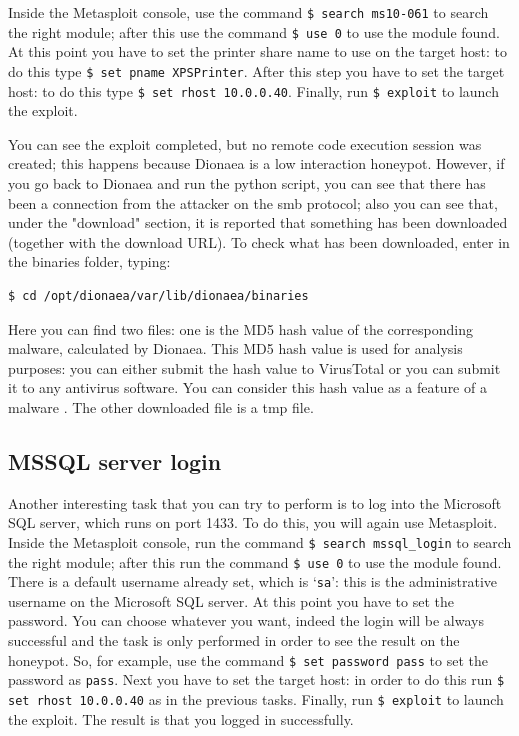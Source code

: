 \documentclass[epsfig,a4paper,11pt,titlepage,oneside,openany]{book}
\begin{document}
\begin{itemize}
Inside the Metasploit console, use the command \texttt{\$ search ms10-061} to search the right module; after this use the command \texttt{\$ use 0} to use the module found. At this point you have to set the printer share name to use on the target host: to do this type \texttt{\$ set pname XPSPrinter}. After this step you have to set the target host: to do this type \texttt{\$ set rhost 10.0.0.40}. Finally, run \texttt{\$ exploit} to launch the exploit.

You can see the exploit completed, but no remote code execution session was created; this happens because Dionaea is a low interaction honeypot. However, if you go back to Dionaea and run the python script, you can see that there has been a connection from the attacker on the smb protocol; also you can see that, under the "download" section, it is reported that something has been downloaded (together with the download URL). To check what has been downloaded, enter in the binaries folder, typing:
\begin{lstlisting}[language=bash]
$ cd /opt/dionaea/var/lib/dionaea/binaries
\end{lstlisting}

\noindent Here you can find two files: one is the MD5 hash value of the corresponding malware, calculated by Dionaea. This MD5 hash value is used for analysis purposes: you can either submit the hash value to VirusTotal or you can submit it to any antivirus software. You can consider this hash value as a feature of a malware \cite{malware_capturing}. The other downloaded file is a tmp file.


\subsection{MSSQL server login}

Another interesting task that you can try to perform is to log into the Microsoft SQL server, which runs on port 1433. To do this, you will again use Metasploit. Inside the Metasploit console, run the command \texttt{\$ search mssql\_login} to search the right module; after this run the command \texttt{\$ use 0} to use the module found. There is a default username already set, which is ‘\texttt{sa}’: this is the administrative username on the Microsoft SQL server. At this point you have to set the password. You can choose whatever you want, indeed the login will be always successful and the task is only performed in order to see the result on the honeypot. So, for example, use the command \texttt{\$ set password pass} to set the password as \texttt{pass}. Next you have to set the target host: in order to do this run \texttt{\$ set rhost 10.0.0.40} as in the previous tasks. Finally, run \texttt{\$ exploit} to launch the exploit. The result is that you logged in successfully.


\end{itemize}
\end{document}
